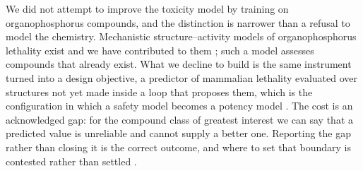 \documentclass[1p,times]{elsarticle}
\begin{document}
We did not attempt to improve the toxicity model by training on organophosphorus
compounds, and the distinction is narrower than a refusal to model the
chemistry. Mechanistic structure--activity models of organophosphorus lethality
exist and we have contributed to them \cite{qsarld50}; such a model assesses
compounds that already exist. What we decline to build is the same instrument
turned into a design objective, a predictor of mammalian lethality evaluated
over structures not yet made inside a loop that proposes them, which is the
configuration in which a safety model becomes a potency model
\cite{urbina2022}. The cost is an acknowledged gap: for the compound class of
greatest interest we can say that a predicted value is unreliable and cannot
supply a better one. Reporting the gap rather than closing it is the correct
outcome, and where to set that boundary is contested rather than settled
\cite{cbrndisclose}.
\end{document}
